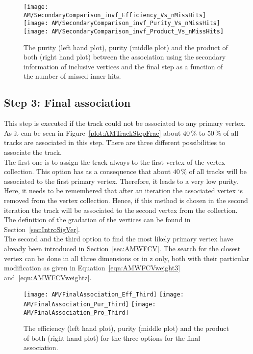 \begin{figure}[!ht]
  \centering
  \texttt{[image: AM/SecondaryComparison\_invf\_Efficiency\_Vs\_nMissHits]}
  \texttt{[image: AM/SecondaryComparison\_invf\_Purity\_Vs\_nMissHits]}
  \texttt{[image: AM/SecondaryComparison\_invf\_Product\_Vs\_nMissHits]}
  \caption[Efficiency, purity and their product for the association with inclusive vertices vs final association as a function of missed inner hits]{The purity (left hand plot), purity (middle plot) and the product of both (right hand plot) between the association using the secondary information of inclusive vertices and the final step as a function of the number of missed inner hits.\label{plot:AMWFSVinvfEffAndPurVsFA}}
\end{figure}


\subsection{Step 3: Final association\label{sec:AMWFFA}}

This step is executed if the track could not be associated to any primary vertex. As it can be seen in Figure~\ref{plot:AMTrackStepFrac} about $40\,\%$ to $50\,\%$ of all tracks are associated in this step. There are three different possibilities to associate the track. \\
The first one is to assign the track always to the first vertex of the vertex collection. This option has as a consequence that about $40\,\%$ of all tracks will be associated to the first primary vertex. Therefore, it leads to a very low purity. Here, it needs to be remembered that after an iteration the associated vertex is removed from the vertex collection. Hence, if this method is chosen in the second iteration the track will be associated to the second vertex from the collection. The definition of the gradation of the vertices can be found in Section~\ref{sec:IntroSigVer}. \\
The second and the third option to find the most likely primary vertex have already been introduced in Section~\ref{sec:AMWFCV}. The search for the closest vertex can be done in all three dimensions or in z only, both with their particular modification as given in Equation~\ref{eqn:AMWFCVweight3} and~\ref{eqn:AMWFCVweightz}.

\begin{figure}[!ht]
  \centering
  \texttt{[image: AM/FinalAssociation\_Eff\_Third]}
  \texttt{[image: AM/FinalAssociation\_Pur\_Third]}
  \texttt{[image: AM/FinalAssociation\_Pro\_Third]}
  \caption[Effciency, purity and their product for the three options for the final association]{The efficiency (left hand plot), purity (middle plot) and the product of both (right hand plot) for the three options for the final association.\label{plot:AMWFFA}}
\end{figure}

